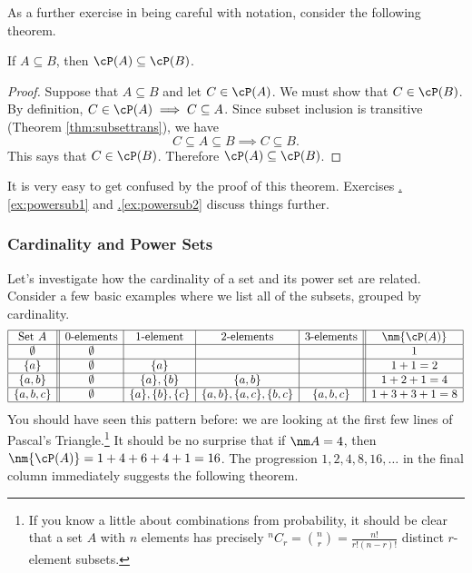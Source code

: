 \noindent As a further exercise in being careful with notation, consider the following theorem.

\begin{thm}\label{thm:powersub}
If $A\subseteq B$, then $\cP(A)\subseteq\cP(B)$.
\end{thm}

\begin{proof}
Suppose that $A\subseteq B$ and let $C\in\cP(A)$. We must show that $C\in\cP(B)$.\\
By definition, $C\in\cP(A)\implies C\subseteq A$. Since subset inclusion is transitive (Theorem \hyperlink{thm:subsettranslnk}{\ref*{thm:subsettrans}}), we have
\[C\subseteq A\subseteq B\implies C\subseteq B.\]
This says that $C\in\cP(B)$. Therefore $\cP(A)\subseteq\cP(B)$.
\end{proof}

\noindent It is very easy to get confused by the proof of this theorem. Exercises \hyperref[ex:powersub1]{\thesubsection.\ref*{ex:powersub1}} and \hyperref[ex:powersub2]{\thesubsection.\ref*{ex:powersub2}} discuss things further.


\subsubsection*{Cardinality and Power Sets}

Let's investigate how the cardinality of a set and its power set are related. Consider a few basic examples where we list all of the subsets, grouped by cardinality.
\[\begin{array}{|c||c|c|c|c||c|}
\hline
\text{Set }A&\text{0-elements}&\text{1-element}&\text{2-elements}&\text{3-elements}&\nm{\cP(A)}\\\hline
\emptyset&\emptyset&&&&1\\\hline
\{a\}&\emptyset&\{a\}&&&1+1=2\\\hline
\{a,b\}&\emptyset&\{a\},\{b\}&\{a,b\}&&1+2+1=4\\\hline
\{a,b,c\}&\emptyset&\{a\},\{b\},\{c\}&\{a,b\},\{a,c\},\{b,c\}&\{a,b,c\}&1+3+3+1=8\\\hline
\end{array}\]
You should have seen this pattern before: we are looking at the first few lines of Pascal's Triangle.\footnote{If you know a little about combinations from probability, it should be clear that a set $A$ with $n$ elements has precisely ${}^nC_r=\binom nr=\frac{n!}{r!(n-r)!}$ distinct $r$-element subsets.} It should be no surprise that if $\nm A=4$, then $\nm{\cP(A)}=1+4+6+4+1=16$. The progression $1,2,4,8,16,\ldots$ in the final column immediately suggests the following theorem.

